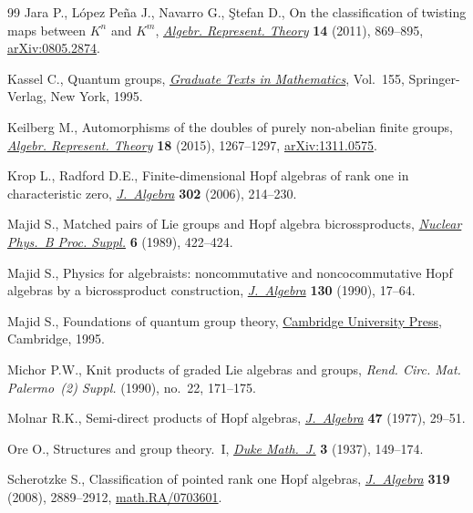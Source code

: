 \begin{thebibliography}{99}
Jara P., L\'opez Pe\~na J., Navarro G., \c{S}tefan D., On the classification of
 twisting maps between {$K^n$} and {$K^m$}, \href{https://doi.org/10.1007/s10468-010-9222-x}{\textit{Algebr. Represent. Theory}}
 \textbf{14} (2011), 869--895, \href{https://arxiv.org/abs/0805.2874}{arXiv:0805.2874}.

Kassel C., Quantum groups, \href{https://doi.org/10.1007/978-1-4612-0783-2}{\textit{Graduate Texts in Mathematics}}, Vol.~155,
 Springer-Verlag, New York, 1995.

Keilberg M., Automorphisms of the doubles of purely non-abelian finite groups,
 \href{https://doi.org/10.1007/s10468-015-9540-0}{\textit{Algebr. Represent. Theory}} \textbf{18} (2015), 1267--1297,
 \href{https://arxiv.org/abs/1311.0575}{arXiv:1311.0575}.

Krop L., Radford D.E., Finite-dimensional {H}opf algebras of rank one in
 characteristic zero, \href{https://doi.org/10.1016/j.jalgebra.2006.03.031}{\textit{J.~Algebra}} \textbf{302} (2006), 214--230.

Majid S., Matched pairs of {L}ie groups and {H}opf algebra bicrossproducts,
 \href{https://doi.org/10.1016/0920-5632(89)90488-X}{\textit{Nuclear Phys.~B Proc. Suppl.}} \textbf{6} (1989), 422--424.

Majid S., Physics for algebraists: noncommutative and noncocommutative {H}opf
 algebras by a bicrossproduct construction, \href{https://doi.org/10.1016/0021-8693(90)90099-A}{\textit{J.~Algebra}} \textbf{130}
 (1990), 17--64.

Majid S., Foundations of quantum group theory, \href{https://doi.org/10.1017/CBO9780511613104}{Cambridge University Press},
 Cambridge, 1995.

Michor P.W., Knit products of graded {L}ie algebras and groups, \textit{Rend. Circ. Mat. Palermo~(2) Suppl.} (1990),
 no.~22, 171--175.

Molnar R.K., Semi-direct products of {H}opf algebras, \href{https://doi.org/10.1016/0021-8693(77)90208-3}{\textit{J.~Algebra}}
 \textbf{47} (1977), 29--51.

Ore O., Structures and group theory.~{I}, \href{https://doi.org/10.1215/S0012-7094-37-00311-9}{\textit{Duke Math.~J.}} \textbf{3}
 (1937), 149--174.

Scherotzke S., Classification of pointed rank one {H}opf algebras,
 \href{https://doi.org/10.1016/j.jalgebra.2008.01.028}{\textit{J.~Algebra}} \textbf{319} (2008), 2889--2912,
 \href{https://arxiv.org/abs/math.RA/0703601}{math.RA/0703601}.


\end{thebibliography}
